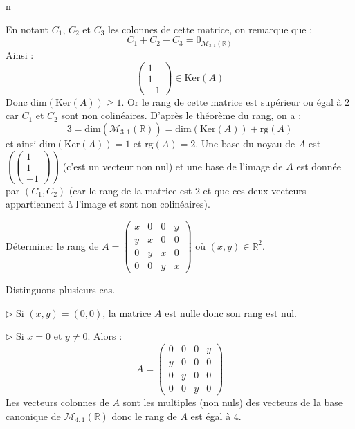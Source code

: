 n\documentclass[a4paper,10pt]{report}
\begin{document}
\corr En notant $C_1$, $C_2$ et $C_3$ les colonnes de cette matrice, on remarque que :
$$C_1+C_2-C_3 = 0_{\mathcal{M}_{3,1}(\mathbb{R})}$$
Ainsi :
$$ \begin{pmatrix}
1 \\
1 \\
-1 
\end{pmatrix} \in \textrm{Ker}(A) $$
Donc $\textrm{dim}(\textrm{Ker}(A)) \geq 1$. Or le rang de cette matrice est supérieur ou égal à $2$ car $C_1$ et $C_2$ sont non colinéaires. D'après le théorème du rang, on a :
$$ 3=\textrm{dim}(\mathcal{M}_{3,1}(\mathbb{R})) = \textrm{dim}(\textrm{Ker}(A)) + \textrm{rg}(A)$$
et ainsi $\textrm{dim}(\textrm{Ker}(A)) = 1$ et $\textrm{rg}(A)=2$. Une base du noyau de $A$ est $\left(  \begin{pmatrix}
1 \\
1 \\
-1 
\end{pmatrix} \right)$ (c'est un vecteur non nul) et une base de l'image de $A$ est donnée par $(C_1,C_2)$ (car le rang de la matrice est $2$ et que ces deux vecteurs appartiennent à l'image et sont non colinéaires).

\begin{Exa} Déterminer le rang de $A = \begin{pmatrix}
x & 0 & 0& y \\
y & x & 0 & 0 \\
0 & y & x & 0 \\
0 & 0 & y & x
\end{pmatrix}$ où $(x,y) \in \mathbb{R}^2$.
\end{Exa} 

\corr Distinguons plusieurs cas.

\medskip

\noindent $\rhd$ Si $(x,y)=(0,0)$, la matrice $A$ est nulle donc son rang est nul.

\medskip

\noindent $\rhd$ Si $x=0$ et $y \neq 0$. Alors :
$$ A = \begin{pmatrix}
0 & 0 & 0& y \\
y & 0 & 0 & 0 \\
0 & y & 0 & 0 \\
0 & 0 & y & 0
\end{pmatrix}$$
Les vecteurs colonnes de $A$ sont les multiples (non nuls) des vecteurs de la base canonique de $\mathcal{M}_{4,1}(\mathbb{R})$ donc le rang de $A$ est égal à $4$.

\medskip
\end{document}
